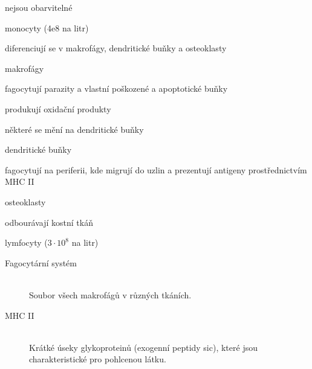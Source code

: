\documentclass[DIV=8]{scrreprt}
\begin{document}
\begin{myItemize}[nosep]
    \item nejsou obarvitelné
    \item monocyty (\si{4e8} na litr)
\begin{myItemize}[nosep]
    \item diferenciují se v makrofágy, dendritické buňky a osteoklasty
\begin{myItemize}[nosep]
    \item makrofágy
\begin{myItemize}[nosep]
    \item fagocytují parazity a vlastní poškozené a apoptotické buňky
    \item produkují oxidační produkty
    \item některé se mění na dendritické buňky
\end{myItemize}

    \item dendritické buňky
\begin{myItemize}[nosep]
    \item fagocytují na periferii, kde migrují do uzlin a prezentují antigeny prostřednictvím MHC II
\end{myItemize}

    \item osteoklasty
\begin{myItemize}[nosep]
    \item odbourá­va­jí kost­ní tkáň
\end{myItemize}

\end{myItemize}

\end{myItemize}

    \item lymfocyty (\(3 \cdot 10^8\) na litr)
\end{myItemize}



\begin{description}
\item[Fagocytární systém]\hfill \\
Soubor všech makrofágů v různých tkáních.


\item[MHC II]\hfill \\
Krátké úseky glykoproteinů (exogenní peptidy sic), které jsou charakteristické pro pohlcenou látku.

\end{description}
\end{document}
